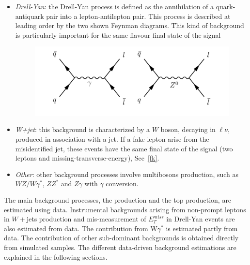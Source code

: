 \begin{itemize}
\begin{figure}[h]
\end{figure}
\item \textit{Drell-Yan}: the Drell-Yan process is defined as the annihilation of a quark-antiquark pair into a lepton-antilepton pair. This process is described at leading order by
the two  shown Feynman diagrams. %
This kind of background is particularly important for the same flavour final state of the signal
\begin{figure}[h]
\centering
\vspace{0.5cm}
\includegraphics[scale= 0.7]{../Cap5/dy}
\end{figure}

\item \textit{W+jet}: this background is characterized by a $W$ boson, decaying in $\ell \nu$, produced in association with a jet. If a fake lepton arise from the misidentified jet, these events have  the same final state of the signal (two leptons and missing-transverse-energy), Sec~\ref{fk}. 

\item \textit{Other}: other background processes involve multibosons production, such as $WZ/W\gamma^*$, $ZZ^*$ and $Z\gamma$ with $\gamma$ conversion.

\end{itemize}
The main background processes, the \WW production and the top production, are estimated using data. 
Instrumental backgrounds arising from non-prompt leptons in $W+$jets production and mis-measurement of $E_T^{miss}$ in Drell-Yan events are also estimated from
data. The contribution from W$\gamma^*$  is estimated partly from data. The
contribution of other sub-dominant backgrounds is obtained directly from simulated samples. The different data-driven background estimations are explained in the following sections. 

